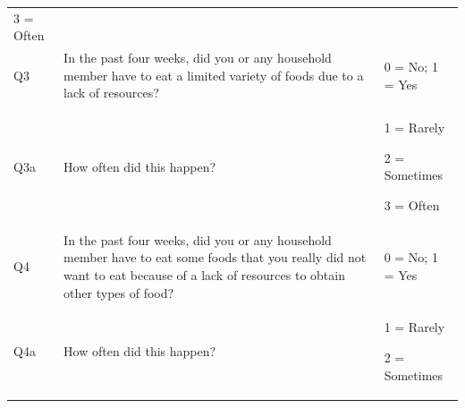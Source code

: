 \documentclass[12pt,]{book}
\theoremstyle{definition}
\theoremstyle{definition}
\theoremstyle{definition}
\theoremstyle{remark}
\begin{document}
\begin{longtable}[]{@{}lll@{}}
\begin{minipage}[t]{0.32\columnwidth}
3 = Often\strut
\end{minipage}\tabularnewline
\begin{minipage}[t]{0.07\columnwidth}\raggedright
Q3\strut
\end{minipage} & \begin{minipage}[t]{0.62\columnwidth}\raggedright
In the past four weeks, did you or any household member have to eat a
limited variety of foods due to a lack of resources?\strut
\end{minipage} & \begin{minipage}[t]{0.22\columnwidth}\raggedright
0 = No; 1 = Yes\strut
\end{minipage}\tabularnewline
\begin{minipage}[t]{0.32\columnwidth}\raggedright
Q3a\strut
\end{minipage} & \begin{minipage}[t]{0.32\columnwidth}\raggedright
How often did this happen?\strut
\end{minipage} & \begin{minipage}[t]{0.32\columnwidth}\raggedright
1 = Rarely

2 = Sometimes

3 = Often\strut
\end{minipage}\tabularnewline
\begin{minipage}[t]{0.07\columnwidth}\raggedright
Q4\strut
\end{minipage} & \begin{minipage}[t]{0.62\columnwidth}\raggedright
In the past four weeks, did you or any household member have to eat some
foods that you really did not want to eat because of a lack of resources
to obtain other types of food?\strut
\end{minipage} & \begin{minipage}[t]{0.22\columnwidth}\raggedright
0 = No; 1 = Yes\strut
\end{minipage}\tabularnewline
\begin{minipage}[t]{0.32\columnwidth}\raggedright
Q4a\strut
\end{minipage} & \begin{minipage}[t]{0.32\columnwidth}\raggedright
How often did this happen?\strut
\end{minipage} & \begin{minipage}[t]{0.32\columnwidth}\raggedright
1 = Rarely

2 = Sometimes


\end{minipage}
\end{longtable}
\end{document}
